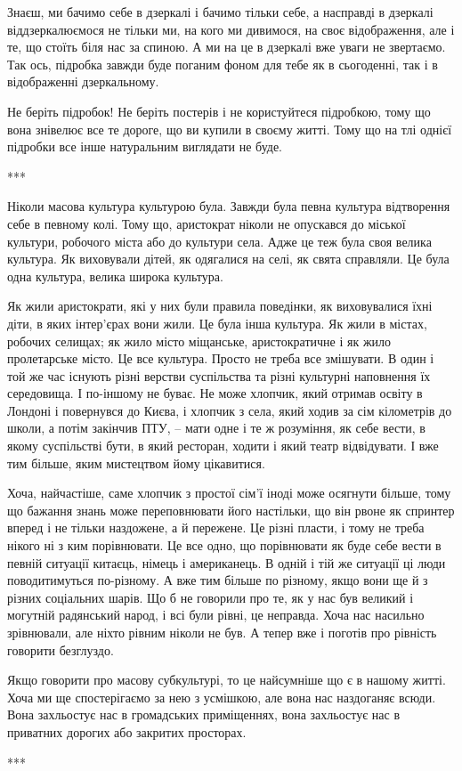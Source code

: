 Знаєш, ми бачимо себе в дзеркалі і бачимо тільки себе, а насправді в дзеркалі
віддзеркалюємося не тільки ми, на кого ми дивимося, на своє відображення, але і
те, що стоїть біля нас за спиною. А ми на це в дзеркалі вже уваги не звертаємо.
Так ось, підробка завжди буде поганим фоном для тебе як в сьогоденні, так і в
відображенні дзеркальному.

Не беріть підробок! Не беріть постерів і не користуйтеся підробкою, тому що
вона знівелює все те дороге, що ви купили в своєму житті. Тому що на тлі однієї
підробки все інше натуральним виглядати не буде.

***

Ніколи масова культура культурою була. Завжди була певна культура відтворення
себе в певному колі. Тому що, аристократ ніколи не опускався до міської
культури, робочого міста або до культури села. Адже це теж була своя велика
культура. Як виховували дітей, як одягалися на селі, як свята справляли. Це
була одна культура, велика широка культура. 

Як жили аристократи, які у них були
правила поведінки, як виховувалися їхні діти, в яких інтер'єрах вони жили. Це
була інша культура. Як жили в містах, робочих селищах; як жило місто міщанське,
аристократичне і як жило пролетарське місто. Це все культура. Просто не треба
все змішувати. В один і той же час існують різні верстви суспільства та різні
культурні наповнення їх середовища. І по-іншому не буває. Не може хлопчик, який
отримав освіту в Лондоні і повернувся до Києва, і хлопчик з села, який ходив за
сім кілометрів до школи, а потім закінчив ПТУ, – мати одне і те ж розуміння, як
себе вести, в якому суспільстві бути, в який ресторан, ходити і який театр
відвідувати. І вже тим більше, яким мистецтвом йому цікавитися. 

Хоча,
найчастіше, саме хлопчик з простої сім'ї іноді може осягнути більше, тому що
бажання знань може переповнювати його настільки, що він рвоне як спринтер
вперед і не тільки наздожене, а й пережене. Це різні пласти, і тому не треба
нікого ні з ким порівнювати. Це все одно, що порівнювати як буде себе вести в
певній ситуації китаєць, німець і американець. В одній і тій же ситуації ці
люди поводитимуться по-різному. А вже тим більше по різному, якщо вони ще й з
різних соціальних шарів. Що б не говорили про те, як у нас був великий і
могутній радянський народ, і всі були рівні, це неправда. Хоча нас насильно
зрівнювали, але ніхто рівним ніколи не був. А тепер вже і поготів про рівність
говорити безглуздо.

Якщо говорити про масову субкультурі, то це найсумніше що є в нашому житті.
Хоча ми ще спостерігаємо за нею з усмішкою, але вона нас наздоганяє всюди. Вона
захльостує нас в громадських приміщеннях, вона захльостує нас в приватних
дорогих або закритих просторах.

***


